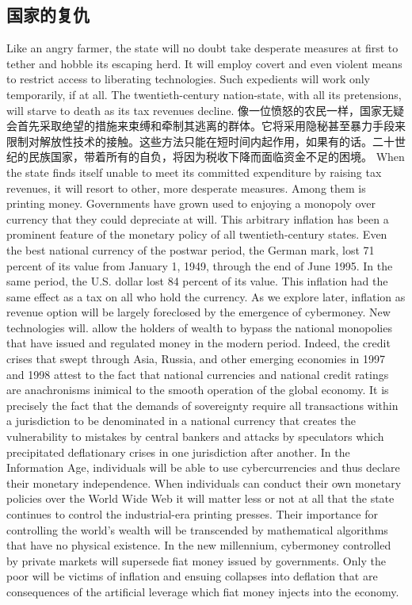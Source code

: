\subsection{国家的复仇}
\begin{paracol}{2}[]
Like an angry farmer, the state will no doubt take desperate measures at first to tether and hobble its escaping herd. It will employ covert and even violent means to restrict access to liberating technologies. Such expedients will work only temporarily, if at all. The twentieth-century nation-state, with all its pretensions, will starve to death as its tax revenues decline.
\switchcolumn
像一位愤怒的农民一样，国家无疑会首先采取绝望的措施来束缚和牵制其逃离的群体。它将采用隐秘甚至暴力手段来限制对解放性技术的接触。这些方法只能在短时间内起作用，如果有的话。二十世纪的民族国家，带着所有的自负，将因为税收下降而面临资金不足的困境。
\switchcolumn*
When the state finds itself unable to meet its committed expenditure by raising tax revenues, it will resort to other, more desperate measures. Among them is printing money. Governments have grown used to enjoying a monopoly over currency that they could depreciate at will. This arbitrary inflation has been a prominent feature of the monetary policy of all twentieth-century states. Even the best national currency of the postwar period, the German mark, lost 71 percent of its value from January 1, 1949, through the end of June 1995. In the same period, the U.S. dollar lost 84 percent of its value. This inflation had the same effect as a tax on all who hold the currency. As we explore later, inflation as revenue option will be largely foreclosed by the emergence of cybermoney. New technologies will. allow the holders of wealth to bypass the national monopolies that have issued and regulated money in the modern period. Indeed, the credit crises that swept through Asia, Russia, and other emerging economies in 1997 and 1998 attest to the fact that national currencies and national credit ratings are anachronisms inimical to the smooth operation of the global economy. It is precisely the fact that the demands of sovereignty require all transactions within a jurisdiction to be denominated in a national currency that creates the vulnerability to mistakes by central bankers and attacks by speculators which precipitated deflationary crises in one jurisdiction after another. In the Information Age, individuals will be able to use cybercurrencies and thus declare their monetary independence. When individuals can conduct their own monetary policies over the World Wide Web it will matter less or not at all that the state continues to control the industrial-era printing presses. Their importance for controlling the world's wealth will be transcended by mathematical algorithms that have no physical existence. In the new millennium, cybermoney controlled by private markets will supersede fiat money issued by governments. Only the poor will be victims of inflation and ensuing collapses into deflation that are consequences of the artificial leverage which fiat money injects into the economy.


\end{paracol}
